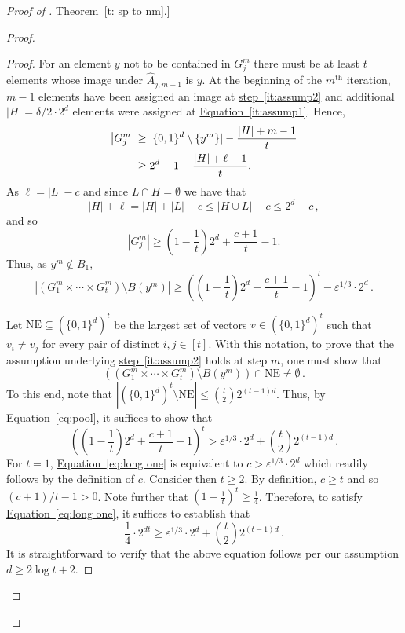 \documentclass[11pt]{article}
\numberwithin{equation}{section}
\theoremstyle{definition}
\theoremstyle{plain}
\newcommand{\expref}[2]{\hyperref[#2]{#1~\ref{#2}}}
\newcommand{\expeqref}[2]{\hyperref[#2]{#1~\eqref{#2}}}
\newcommand{\eps}{\varepsilon}
\newcommand{\abs}[1]{\left\lvert #1\right\rvert}
\newcommand{\ane}{\mathrm{NE}}
\begin{document}
\begin{proof}[Proof of \expref{Theorem}{t: sp to nm}.]
\begin{proof}
\begin{proof}
For an element $y$ not to be contained in $G^m_j$ there must be at least $t$ elements whose image under $\widehat{A}_{j,m-1}$ is $y$. At the beginning of the $m^{\text{th}}$ iteration, $m-1$ elements have been assigned an image at \expeqref{step}{it:assump2} and additional 
%
%
$|H| = \delta/2 \cdot 2^d$ 
%
elements were assigned at  \expeqref{Equation}{it:assump1}. Hence,
\begin{align}\label{eq:gm bound}
\abs{G_j^m} &\geq |\{0,1\}^d \setminus \{ y^m\}| - \frac{|H| + m-1}{t} \notag \\
&\ge 2^d -1 - \frac{|H| + \ell-1}{t}. %
%
\end{align}
As
$\ell = \abs{L} - c$ and since $L \cap H = \emptyset$ we have that
\[
|H|+\ell = |H| + \abs{L} - c \le |H \cup L| - c \le 2^d-c\,,
\]
and so
\[
\abs{G_j^m} \ge \left(1-\frac1{t}\right)2^d +  \frac{c+1}{t} -1.%
\]
Thus, as $y^m \not\in B_1$,
\begin{equation}\label{eq:pool}
\abs{\left(G_1^m \times \cdots \times G_t^m\right) \setminus B(y^m)} \ge \left(\left(1-\frac1{t} \right)2^d +  \frac{c+1}{t} -1\right)^t - \eps^{1/3} \cdot 2^d\,.
\end{equation}
%
%



Let $\ane \subseteq (\{0,1\}^d)^t$ be the largest set of vectors $v \in (\{0,1\}^d)^t$ such that $v_i \neq v_j$ for every pair of distinct $i,j \in [t]$. With this notation, to prove that the assumption underlying  \expeqref{step}{it:assump2} holds at step $m$, one must show that
\begin{equation}\label{eq:eqeqeqqeqeqseger}
\left(\left(G_1^m \times \cdots \times G_t^m \right)\setminus B(y^m)\right)\cap \ane \neq \emptyset\,.
\end{equation}
To this end, note that $\left|(\{0,1\}^d)^t \setminus \ane\right| \le \binom{t}{2} 2^{(t-1)d}$. Thus, by \expeqref{Equation}{eq:pool}, it suffices to show that
\begin{equation}\label{eq:long one}
\left(\left(1-\frac1{t} \right)2^d +  \frac{c+1}{t} -1\right)^t > \eps^{1/3} \cdot 2^d + \binom{t}{2} 2^{(t-1)d}\,. 
\end{equation}
For $t=1$, \expeqref{Equation}{eq:long one} is equivalent to
$
c > \eps^{1/3} \cdot 2^d
$
which readily follows by the definition of $c$. Consider then $t \ge 2$. By definition, $c \ge t$ and so %
%
$(c+1)/t-1 > 0$. 
%
Note further that $\left(1-\frac1{t}\right)^t \ge \frac1{4}$. Therefore, to satisfy \expeqref{Equation}{eq:long one}, it suffices to establish that
\[
\frac1{4} \cdot 2^{dt} \ge \eps^{1/3} \cdot 2^d + \binom{t}{2} 2^{(t-1)d}\,.
\]
It is straightforward to verify that the above equation follows per our assumption $d \ge 2\log{t} + 2$.
\end{proof}



\end{proof}
\end{proof}
\end{document}
